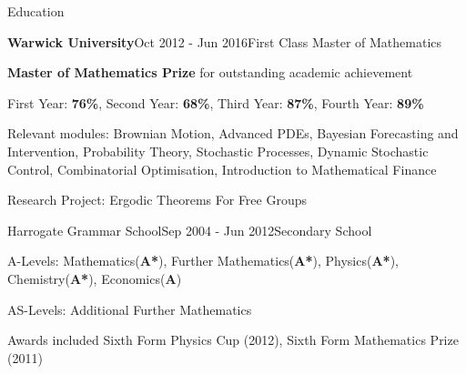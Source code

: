 \documentclass{resume} %
\begin{document}
\begin{rSection}{Education}
	\begin{rSubsection}{\bf Warwick University}{Oct 2012 - Jun 2016}{First Class Master of Mathematics}{}
\item {\bf Master of Mathematics Prize} for outstanding academic achievement
\item First Year: {\bf 76\%}, Second Year: {\bf 68\%}, Third Year: {\bf 87\%}, Fourth Year: {\bf 89\%}
\item Relevant modules: Brownian Motion, Advanced PDEs, Bayesian Forecasting and Intervention, Probability Theory, Stochastic Processes, Dynamic Stochastic Control, Combinatorial Optimisation, Introduction to Mathematical Finance
\item Research Project: Ergodic Theorems For Free Groups
\end{rSubsection}
\begin{rSubsection}{Harrogate Grammar School}{Sep 2004 - Jun 2012}{Secondary School}{}
\item A-Levels: Mathematics({\bf A*}), Further Mathematics({\bf A*}), Physics({\bf A*}), Chemistry({\bf A*}), Economics({\bf A})
\item AS-Levels: Additional Further Mathematics
\item Awards included Sixth Form Physics Cup (2012), Sixth Form Mathematics Prize (2011)
	\end{rSubsection}

\end{rSection}

\end{document}
